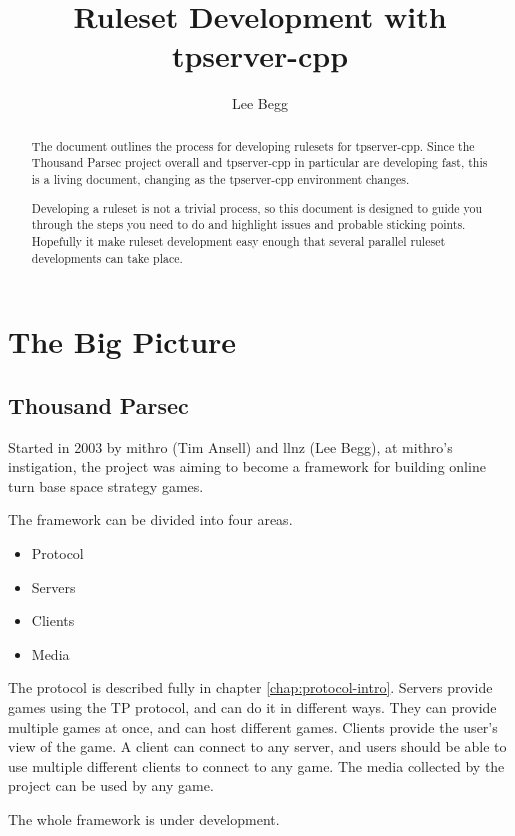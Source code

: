 \documentclass[a4paper,11pt]{report}
\title{Ruleset Development with tpserver-cpp}
\author{Lee Begg}
\begin{document}
\maketitle

\tableofcontents

\begin{abstract}
The document outlines the process for developing rulesets for tpserver-cpp. Since the Thousand Parsec project overall and tpserver-cpp in particular are developing fast, this is a living document, changing as the tpserver-cpp environment changes.

Developing a ruleset is not a trivial process, so this document is designed to guide you through the steps
you need to do and highlight issues and probable sticking points. Hopefully it make ruleset development easy enough that several parallel ruleset developments can take place.
\end{abstract}

\part{The Big Picture}
\label{part:intro}

\chapter{Thousand Parsec}
\label{chap:tp}
Started in 2003 by mithro (Tim Ansell) and llnz (Lee Begg), at mithro's instigation, the project was aiming to become a framework for building online turn base space strategy games.


The framework can be divided into four areas.
\begin{itemize}
 \item Protocol
 \item Servers
 \item Clients
 \item Media
\end{itemize}

The protocol is described fully in chapter \ref{chap:protocol-intro}. Servers provide games using the TP protocol, and can do it in different ways. They can provide multiple games at once, and can host different games. Clients provide the user's view of the game. A client can connect to any server, and users should be able to use multiple different clients to connect to any game. The media collected by the project can be used by any game.

The whole framework is under development.
\end{document}
